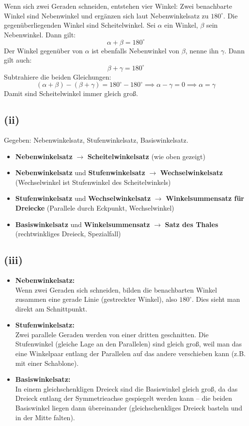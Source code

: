 \documentclass[12pt,a4paper]{article}
\begin{document}
\noindent Wenn sich zwei Geraden schneiden, entstehen vier Winkel: Zwei benachbarte Winkel sind Nebenwinkel und ergänzen sich laut Nebenwinkelsatz zu $180^\circ$. Die gegenüberliegenden Winkel sind Scheitelwinkel. Sei $\alpha$ ein Winkel, $\beta$ sein Nebenwinkel. Dann gilt: 
\[ 
    \alpha + \beta = 180^\circ 
\] 
Der Winkel gegenüber von $\alpha$ ist ebenfalls Nebenwinkel von $\beta$, nenne ihn $\gamma$. Dann gilt auch: 
\[ 
    \beta + \gamma = 180^\circ 
\] 
Subtrahiere die beiden Gleichungen: 
\[ 
    (\alpha + \beta) - (\beta + \gamma) = 180^\circ - 180^\circ \implies \alpha - \gamma = 0 \implies \alpha = \gamma 
\] 
Damit sind Scheitelwinkel immer gleich groß.

\newpage
\subsection*{(ii)}
Gegeben: Nebenwinkelsatz, Stufenwinkelsatz, Basiswinkelsatz. 

\begin{itemize}     
    \item \textbf{Nebenwinkelsatz} $\rightarrow$ \textbf{Scheitelwinkelsatz} (wie oben gezeigt)     
    \item \textbf{Nebenwinkelsatz} und \textbf{Stufenwinkelsatz} $\rightarrow$ \textbf{Wechselwinkelsatz} (Wechselwinkel ist Stufenwinkel des Scheitelwinkels)     
    \item \textbf{Stufenwinkelsatz} und \textbf{Wechselwinkelsatz} $\rightarrow$ \textbf{Winkelsummensatz für Dreiecke} (Parallele durch Eckpunkt, Wechselwinkel)     
    \item \textbf{Basiswinkelsatz} und \textbf{Winkelsummensatz} $\rightarrow$ \textbf{Satz des Thales} (rechtwinkliges Dreieck, Spezialfall) 
\end{itemize}

\subsection*{(iii)}
\begin{itemize}     
    \item \textbf{Nebenwinkelsatz:} \\
    Wenn zwei Geraden sich schneiden, bilden die benachbarten Winkel zusammen eine gerade Linie (gestreckter Winkel), also $180^\circ$. Dies sieht man direkt am Schnittpunkt.
    \item \textbf{Stufenwinkelsatz:} \\
    Zwei parallele Geraden werden von einer dritten geschnitten. Die Stufenwinkel (gleiche Lage an den Parallelen) sind gleich groß, weil man das eine Winkelpaar entlang der Parallelen auf das andere verschieben kann (z.B. mit einer Schablone).
    \item \textbf{Basiswinkelsatz:} \\
    In einem gleichschenkligen Dreieck sind die Basiswinkel gleich groß, da das Dreieck entlang der Symmetrieachse gespiegelt werden kann – die beiden Basiswinkel liegen dann übereinander (gleichschenkliges Dreieck basteln und in der Mitte falten).
\end{itemize}
\end{document}
